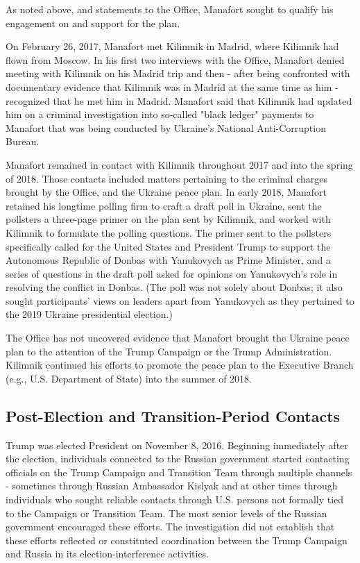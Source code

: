 As noted above,
and statements to the Office, Manafort sought to qualify his engagement on and support for the plan.

On February 26, 2017, Manafort met Kilimnik in Madrid, where Kilimnik had flown from Moscow.%
In his first two interviews with the Office, Manafort denied meeting with Kilimnik on his Madrid trip and then - after being confronted with documentary evidence that Kilimnik was in Madrid at the same time as him - recognized that he met him in Madrid.
Manafort said that Kilimnik had updated him on a criminal investigation into so-called "black ledger" payments to Manafort that was being conducted by Ukraine's National Anti-Corruption Bureau.%

Manafort remained in contact with Kilimnik throughout 2017 and into the spring of 2018.
Those contacts included matters pertaining to the criminal charges brought by the Office,%
and the Ukraine peace plan.
In early 2018, Manafort retained his longtime polling firm to craft a draft poll in Ukraine, sent the pollsters a three-page primer on the plan sent by Kilimnik, and worked with Kilimnik to formulate the polling questions.%
The primer sent to the pollsters specifically called for the United States and President Trump to support the Autonomous Republic of Donbas with Yanukovych as Prime Minister,%
and a series of questions in the draft poll asked for opinions on Yanukovych's role in resolving the conflict in Donbas.%
(The poll was not solely about Donbas; it also sought participants' views on leaders apart from Yanukovych as they pertained to the 2019 Ukraine presidential election.)

The Office has not uncovered evidence that Manafort brought the Ukraine peace plan to the attention of the Trump Campaign or the Trump Administration.
Kilimnik continued his efforts to promote the peace plan to the Executive Branch (e.g., U.S. Department of State) into the summer of 2018.%

\subsection{Post-Election and Transition-Period Contacts}

Trump was elected President on November 8, 2016.
Beginning immediately after the election, individuals connected to the Russian government started contacting officials on the Trump Campaign and Transition Team through multiple channels - sometimes through Russian Ambassador Kislyak and at other times through individuals who sought reliable contacts through U.S. persons not formally tied to the Campaign or Transition Team.
The most senior levels of the Russian government encouraged these efforts.
The investigation did not establish that these efforts reflected or constituted coordination between the Trump Campaign and Russia in its election-interference activities.

